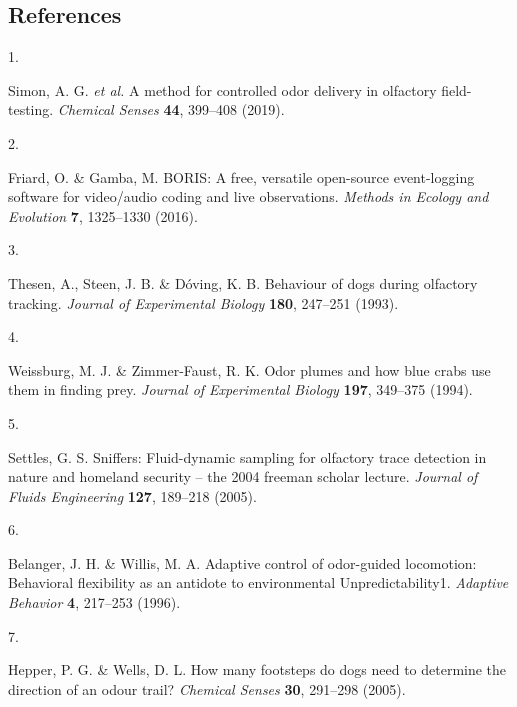 \documentclass[
]{article}
\newlength{\cslhangindent}
\newlength{\csllabelwidth}
\newlength{\cslentryspacingunit} %
\newenvironment{CSLReferences}[2] %
 {%
  \setlength{\parindent}{0pt}
  \ifodd #1
  \let\oldpar\par
  \def\par{\hangindent=\cslhangindent\oldpar}
  \fi
  \setlength{\parskip}{#2\cslentryspacingunit}
 }%
 {}
\newcommand{\CSLLeftMargin}[1]{\parbox[t]{\csllabelwidth}{#1}}
\newcommand{\CSLRightInline}[1]{\parbox[t]{\linewidth - \csllabelwidth}{#1}\break}
\begin{document}
\newpage

\hypertarget{references}{%
\subsection*{References}\label{references}}

\hypertarget{refs}{}
\begin{CSLReferences}{0}{0}
\leavevmode{}%
\CSLLeftMargin{1. }%
\CSLRightInline{Simon, A. G. \emph{et al.} A method for controlled odor delivery in olfactory field-testing. \emph{Chemical Senses} \textbf{44}, 399--408 (2019).}

\leavevmode{}%
\CSLLeftMargin{2. }%
\CSLRightInline{Friard, O. \& Gamba, M. {BORIS}: A free, versatile open-source event-logging software for video/audio coding and live observations. \emph{Methods in Ecology and Evolution} \textbf{7}, 1325--1330 (2016).}

\leavevmode{}%
\CSLLeftMargin{3. }%
\CSLRightInline{Thesen, A., Steen, J. B. \& Dóving, K. B. Behaviour of dogs during olfactory tracking. \emph{Journal of Experimental Biology} \textbf{180}, 247--251 (1993).}

\leavevmode{}%
\CSLLeftMargin{4. }%
\CSLRightInline{Weissburg, M. J. \& Zimmer-Faust, R. K. Odor plumes and how blue crabs use them in finding prey. \emph{Journal of Experimental Biology} \textbf{197}, 349--375 (1994).}

\leavevmode{}%
\CSLLeftMargin{5. }%
\CSLRightInline{Settles, G. S. Sniffers: Fluid-dynamic sampling for olfactory trace detection in nature and homeland security -- the 2004 freeman scholar lecture. \emph{Journal of Fluids Engineering} \textbf{127}, 189--218 (2005).}

\leavevmode{}%
\CSLLeftMargin{6. }%
\CSLRightInline{Belanger, J. H. \& Willis, M. A. Adaptive control of odor-guided locomotion: Behavioral flexibility as an antidote to environmental Unpredictability1. \emph{Adaptive Behavior} \textbf{4}, 217--253 (1996).}

\leavevmode{}%
\CSLLeftMargin{7. }%
\CSLRightInline{Hepper, P. G. \& Wells, D. L. How many footsteps do dogs need to determine the direction of an odour trail? \emph{Chemical Senses} \textbf{30}, 291--298 (2005).}


\end{CSLReferences}
\end{document}
